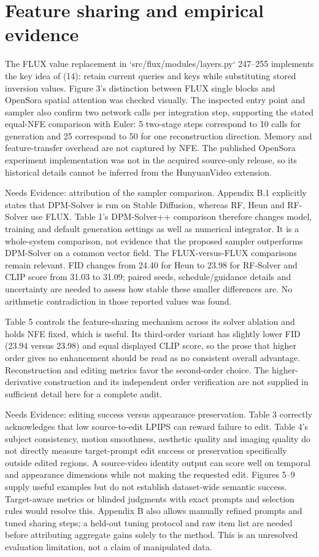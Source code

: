 \documentclass[10pt]{article}
\begin{document}
\section*{Feature sharing and empirical evidence}
The FLUX value replacement in `src/flux/modules/layers.py` 247–255 implements the key idea of (14): retain current queries and keys while substituting stored inversion values. Figure 3’s distinction between FLUX single blocks and OpenSora spatial attention was checked visually. The inspected entry point and sampler also confirm two network calls per integration step, supporting the stated equal-NFE comparison with Euler: 5 two-stage steps correspond to 10 calls for generation and 25 correspond to 50 for one reconstruction direction. Memory and feature-transfer overhead are not captured by NFE. The published OpenSora experiment implementation was not in the acquired source-only release, so its historical details cannot be inferred from the HunyuanVideo extension.\par
Needs Evidence: attribution of the sampler comparison. Appendix B.1 explicitly states that DPM-Solver is run on Stable Diffusion, whereas RF, Heun and RF-Solver use FLUX. Table 1’s DPM-Solver++ comparison therefore changes model, training and default generation settings as well as numerical integrator. It is a whole-system comparison, not evidence that the proposed sampler outperforms DPM-Solver on a common vector field. The FLUX-versus-FLUX comparisons remain relevant. FID changes from 24.40 for Heun to 23.98 for RF-Solver and CLIP score from 31.03 to 31.09; paired seeds, schedule/guidance details and uncertainty are needed to assess how stable these smaller differences are. No arithmetic contradiction in those reported values was found.\par
Table 5 controls the feature-sharing mechanism across its solver ablation and holds NFE fixed, which is useful. Its third-order variant has slightly lower FID (23.94 versus 23.98) and equal displayed CLIP score, so the prose that higher order gives no enhancement should be read as no consistent overall advantage. Reconstruction and editing metrics favor the second-order choice. The higher-derivative construction and its independent order verification are not supplied in sufficient detail here for a complete audit.\par
Needs Evidence: editing success versus appearance preservation. Table 3 correctly acknowledges that low source-to-edit LPIPS can reward failure to edit. Table 4’s subject consistency, motion smoothness, aesthetic quality and imaging quality do not directly measure target-prompt edit success or preservation specifically outside edited regions. A source-video identity output can score well on temporal and appearance dimensions while not making the requested edit. Figures 5–9 supply useful examples but do not establish dataset-wide semantic success. Target-aware metrics or blinded judgments with exact prompts and selection rules would resolve this. Appendix B also allows manually refined prompts and tuned sharing steps; a held-out tuning protocol and raw item list are needed before attributing aggregate gains solely to the method. This is an unresolved evaluation limitation, not a claim of manipulated data.\par
\end{document}
